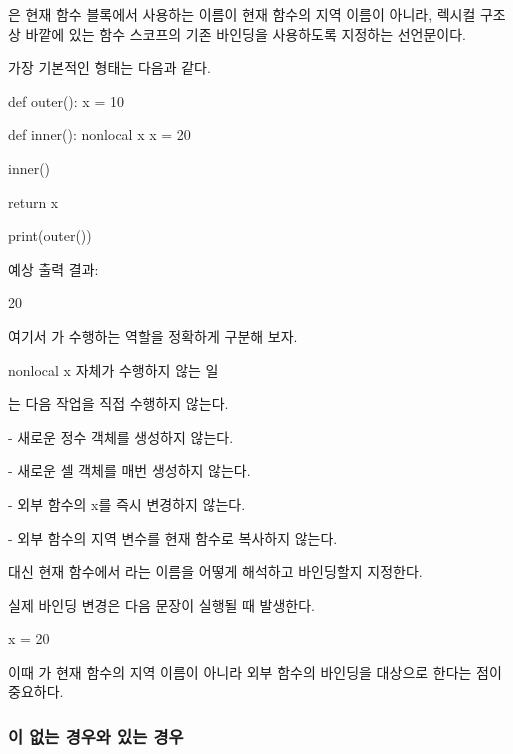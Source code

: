 은 현재 함수 블록에서 사용하는 이름이 현재 함수의 지역 이름이 아니라, 렉시컬 구조상 바깥에 있는 함수 스코프의 기존 바인딩을 사용하도록 지정하는 선언문이다.

가장 기본적인 형태는 다음과 같다.

\begin{dhkcode}
def outer():
    x = 10

    def inner():
        nonlocal x
        x = 20

    inner()

    return x


print(outer())
\end{dhkcode}

예상 출력 결과:

\begin{dhkzsh}
20
\end{dhkzsh}

여기서 가 수행하는 역할을 정확하게 구분해 보자.

\begin{dhknote}
\begin{dhksmry}[centered]
nonlocal x 자체가 수행하지 않는 일
\end{dhksmry}
\end{dhknote}

는 다음 작업을 직접 수행하지 않는다.

\begin{dhksmry}
    - 새로운 정수 객체를 생성하지 않는다.

    - 새로운 셀 객체를 매번 생성하지 않는다.

    - 외부 함수의 x를 즉시 변경하지 않는다.

    - 외부 함수의 지역 변수를 현재 함수로 복사하지 않는다.
\end{dhksmry}

대신 현재 함수에서 라는 이름을 어떻게 해석하고 바인딩할지 지정한다.

실제 바인딩 변경은 다음 문장이 실행될 때 발생한다.

\begin{dhkcode}
x = 20
\end{dhkcode}

이때 가 현재 함수의 지역 이름이 아니라 외부 함수의 바인딩을 대상으로 한다는 점이 중요하다.

\subsubsection{이 없는 경우와 있는 경우}

